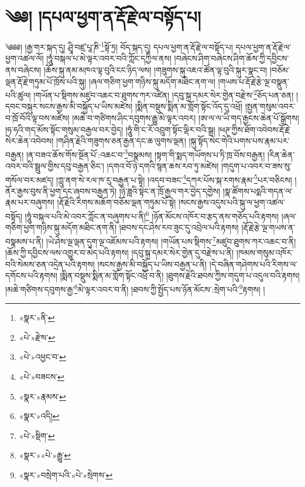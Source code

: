 \chapter{༄༅། །དཔལ་ཕྱག་ན་རྡོ་རྗེ་ལ་བསྟོད་པ།}༄༅༅། །རྒྱ་གར་སྐད་དུ། ཤྲཱི་བཛྲ་པཱ་ཎི་\footnote{«སྣར་»ནི་}སྟོ་ཏྲ། བོད་སྐད་དུ། དཔལ་ཕྱག་ན་རྡོ་རྗེ་ལ་བསྟོད་པ། དཔལ་ཕྱག་ན་རྡོ་རྗེ་ལ་ཕྱག་འཚལ་ལོ། །ཧཱུཾ་བསྐལ་པ་མེ་ལྟར་འབར་བའི་ཀློང་དཀྱིལ་ནས། །བཞེངས་ཤིག་བཞེངས་ཤིག་ཆོས་ཀྱི་དབྱིངས་ནས་བཞེངས། །ཆོས་སྐུ་ནམ་མཁའ་ལྟ་བུའི་ངང་ཉིད་ལས། །གཟུགས་སྐུ་འཇའ་ཚོན་ལྟ་བུའི་སྐུར་སྣང་བ། །བཅོམ་ལྡན་རྡོ་རྗེ་གཏུམ་པོ་ཁྲོས་པའི་སྐུ། །ཞལ་གཅིག་ཕྱག་གཉིས་སྐུ་མདོག་མཐིང་ནག་ལ། །གཡས་པ་རྡོ་རྗེ་རྩེ་ལྔ་བསྣུན་པའི་ཚུལ། །གཡོན་པ་སྡིགས་མཛུབ་འཆང་བ་ཐུགས་ཀར་འཛིན། །དབུ་སྐྲ་དམར་སེར་གྱེན་བརྫེས་\footnote{«པེ་»རྫེས་}ཅོད་པན་ཅན། །དབང་བསྐུར་སངས་རྒྱས་མི་བསྐྱོད་པ་ཡིས་མཛེས། །སྨིན་བསྡུས་སྨིན་མ་གློག་སྟོང་འོད་དུ་འཕྲོ། །སྤྱན་གསུམ་འབར་བ་ཁྲོ་བོའི་ལྟ་བས་མཛེས། །མཆེ་བ་གཙིགས་ཤིང་དབུགས་རྒྱུ་མེ་ལྟར་འབར། །ཨ་ལ་ལ་ཡི་གད་རྒྱངས་ཆེན་པོ་སྒྲོགས། །ཧ་ཧའི་གད་མོས་སྟོང་གསུམ་བརྒྱལ་བར་བྱེད། །ཧཱུཾ་གི་ང་རོ་འབྲུག་སྟོང་ལྡིར་བའི་སྒྲ། །ཕཊ་ཀྱིས་ཐོག་འབེབས་རྡོ་རྗེ་སེར་ཆེན་འབེབས། །གཤིན་རྗེའི་གཟུགས་ཅན་རྒྱན་དང་ཆ་ལུགས་ལྡན། །སྐུ་སྟོད་སེང་གེའི་པགས་པས་རྣམ་པར་བརྒྱན། །ན་བཟའ་ཆོས་གོས་སྔོན་པོ་:འཆང་བ་\footnote{«པེ་»འཕྱང་བ་}བསྣམས། །སྟག་གི་སྨད་གཡོགས་པ་ཏི་ཁྲ་བོས་བརྒྱན། །རིན་ཆེན་འབར་བའི་སྦྲུལ་གྱིས་དབུ་བརྒྱན་ཅིང་། །དགའ་བོ་ཉེ་དགའི་སྙན་ཆས་རབ་ཏུ་མཛེས། །གདུག་པ་འབར་བ་ཟས་སུ་གསོལ་བར་མཛད། །ཀླུ་ནག་སེ་རལ་ཁ་རུ་བརྒྱན་པ་སྟེ། །འདབ་བཟང་\footnote{«པེ་»བཟངས་}དཀར་པོས་སྐ་རགས་རྣམ་\footnote{«སྣར་»རྣམས་}པར་བཅིངས། །ནོར་རྒྱས་བུས་ནི་ཕྱག་དང་ཞབས་བརྒྱན་ཏེ། །ཉི་ཟླའི་སྟེང་ན་ཁྲོ་རྒྱལ་གར་བྱེད་དགྱེས། །སྣ་ཚོགས་པདྨའི་གདན་ལ་རྣམ་པར་བཞུགས། །རྡོ་རྗེའི་རིགས་མཆོག་བཅོམ་ལྡན་གཏུམ་པོ་སྟེ། །སངས་རྒྱས་འདུས་པའི་སྐུ་ལ་ཕྱག་འཚལ་བསྟོད། །ཧཱུཾ་བསྐལ་པའི་མེ་འབར་ཀློང་ན་བཞུགས་པ་ནི།\footnote{«སྣར་»འདི།} །ཉོན་མོངས་འཁོར་བ་རྩད་ནས་གཅོད་པའི་རྟགས། །ཞལ་གཅིག་ཕྱག་གཉིས་སྐུ་མདོག་མཐིང་ནག་ནི། །ཐབས་དང་ཤེས་རབ་ཟུང་དུ་འབྲེལ་པའི་རྟགས། །རྡོ་རྗེ་རྩེ་ལྔ་གཡས་ན་བསྣམས་པ་ནི། །ཡེ་ཤེས་ལྔ་ལྡན་དུག་ལྔ་འཇོམས་པའི་རྟགས། །གཡོན་པས་སྡིགས་\footnote{«པེ་»སྡིག་}མཛུབ་ཐུགས་ཀར་འཆང་བ་ནི། །ཆོས་ཀྱི་དབྱིངས་ལས་འགྱུར་བ་མེད་པའི་རྟགས། །དབུ་སྐྲ་དམར་སེར་གྱེན་དུ་བརྫེས་པ་ནི། །ཁམས་གསུམ་འཁོར་བའི་སེམས་ཅན་འདྲེན་པའི་རྟགས། །སངས་རྒྱས་མི་བསྐྱོད་པ་ཡིས་བརྒྱན་པ་ནི། །དེ་བཞིན་གཤེགས་པའི་རིགས་ལ་དགོངས་པའི་རྟགས། །སྨིན་བསྡུས་སྨིན་མ་གློག་སྟོང་འཕྲོ་བ་ནི། །ཐུགས་རྗེའི་ཐབས་ཀྱིས་གདུག་པ་འདུལ་བའི་རྟགས། །མཆེ་གཙིགས་དབུགས་རྒྱ་\footnote{«སྣར་»«པེ་»རྒྱུ་}མེ་ལྟར་འབར་བ་ནི། །ཐབས་ཀྱི་སྤྱོད་པས་ཉོན་མོངས་:སྲེག་པའི་\footnote{«སྣར་»བསྲེག་པའི་«པེ་»སྲེགས་}རྟགས། །
